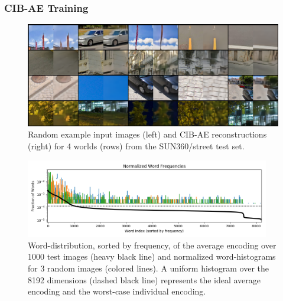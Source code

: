 \subsubsection{CIB-AE Training}
\begin{figure}
    \centering
    \includegraphics[width=\textwidth]{figures/ptz/mc3ae_encodings}
    \caption{Random example input images (left) and CIB-AE reconstructions (right) for 4 worlds (rows) from the SUN360/street test set.}
    \label{fig:cibae_encodings}
\end{figure}

\begin{figure}
    \centering
    \includegraphics[width=0.95\textwidth]{figures/ptz/word_frequency}
    \caption{Word-distribution, sorted by frequency, of the average encoding over 1000 test images (heavy black line) and normalized
             word-histograms for 3 random images (colored lines). A uniform histogram over the 8192 dimensions (dashed black line) represents the ideal average encoding and the worst-case individual encoding.}
    \label{fig:cibae-words-distribution}
\end{figure}

